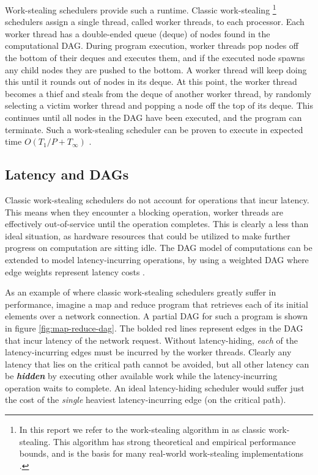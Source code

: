 \documentclass[bsc,frontabs,singlespacing,parskip,deptreport,normalheadings]{infthesis}
\begin{document}
Work-stealing schedulers provide such a runtime. Classic work-stealing
\footnote{In this report we refer to the work-stealing algorithm in
    \cite{arora_thread_1998} as classic work-stealing. This algorithm has strong
    theoretical and empirical performance bounds, and is the basis for many
real-world work-stealing implementations \cite{frigo_implementation_1998}.}
schedulers assign a single thread, called worker threads, to each processor.
Each worker thread has a double-ended queue (deque) of nodes found in the
computational DAG. During program execution, worker threads pop nodes off the
bottom of their deques and executes them, and if the executed node spawns any
child nodes they are pushed to the bottom. A worker thread will keep doing this
until it rounds out of nodes in its deque. At this point, the worker thread
becomes a thief and steals from the deque of another worker thread, by randomly
selecting a victim worker thread and popping a node off the top of its deque.
This continues until all nodes in the DAG have been executed, and the program
can terminate. Such a work-stealing scheduler can be proven to execute in
expected time \(O(T_1 / P + T_\infty)\) \cite{arora_thread_1998}.

\subsection{Latency and DAGs}

Classic work-stealing schedulers do not account for operations that incur
latency. This means when they encounter a blocking operation, worker threads are
effectively out-of-service until the operation completes. This is clearly a less
than ideal situation, as hardware resources that could be utilized to make
further progress on computation are sitting idle. The DAG model of computations
can be extended to model latency-incurring operations, by using a weighted DAG
where edge weights represent latency costs \cite{muller_latency-hiding_2016}.

As an example of where classic work-stealing schedulers greatly suffer in
performance, imagine a map and reduce program that retrieves each of its initial
elements over a network connection. A partial DAG for such a program is shown in figure
\ref{fig:map-reduce-dag}. The bolded red lines represent edges in the
DAG that incur latency of the network request. Without latency-hiding,
\textit{each} of the latency-incurring edges must be incurred by the worker
threads. Clearly any latency that lies on the critical path cannot be avoided,
but all other latency can be \textbf{\textit{hidden}} by executing other
available work while the latency-incurring operation waits to complete. An ideal
latency-hiding scheduler would suffer just the cost of the \textit{single}
heaviest latency-incurring edge (on the critical path).
\end{document}
